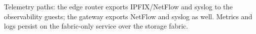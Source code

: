 Telemetry paths: the edge router exports IPFIX/NetFlow and syslog to the
observability guests; the gateway exports NetFlow and syslog as well. Metrics
and logs persist on the fabric-only service over the storage fabric.
